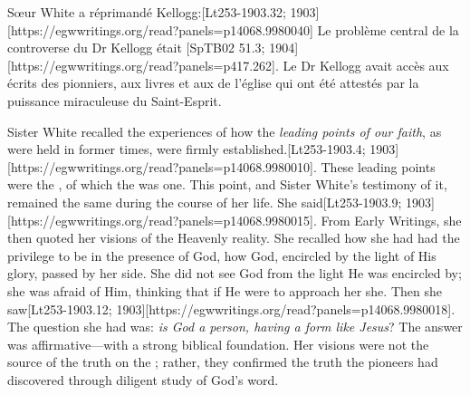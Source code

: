 Sœur White a réprimandé Kellogg:[Lt253-1903.32; 1903][https://egwwritings.org/read?panels=p14068.9980040] Le problème central de la controverse du Dr Kellogg était [SpTB02 51.3; 1904][https://egwwritings.org/read?panels=p417.262]. Le Dr Kellogg avait accès aux écrits des pionniers, aux livres et aux  de l'église qui ont été attestés par la puissance miraculeuse du Saint-Esprit.


Sister White recalled the experiences of how the \textit{leading points of our faith}, as were held in former times, were firmly established.[Lt253-1903.4; 1903][https://egwwritings.org/read?panels=p14068.9980010]. These leading points were the , of which the  was one. This point, and Sister White’s testimony of it, remained the same during the course of her life.  She said[Lt253-1903.9; 1903][https://egwwritings.org/read?panels=p14068.9980015]. From Early Writings, she then quoted her visions of the Heavenly reality. She recalled how she had had the privilege to be in the presence of God, how God, encircled by the light of His glory, passed by her side. She did not see God from the light He was encircled by; she was afraid of Him, thinking that if He were to approach her she. Then she saw[Lt253-1903.12; 1903][https://egwwritings.org/read?panels=p14068.9980018]. The question she had was: \textit{is God a person, having a form like Jesus}? The answer was affirmative—with a strong biblical foundation. Her visions were not the source of the truth on the ; rather, they confirmed the truth the pioneers had discovered through diligent study of God’s word.


